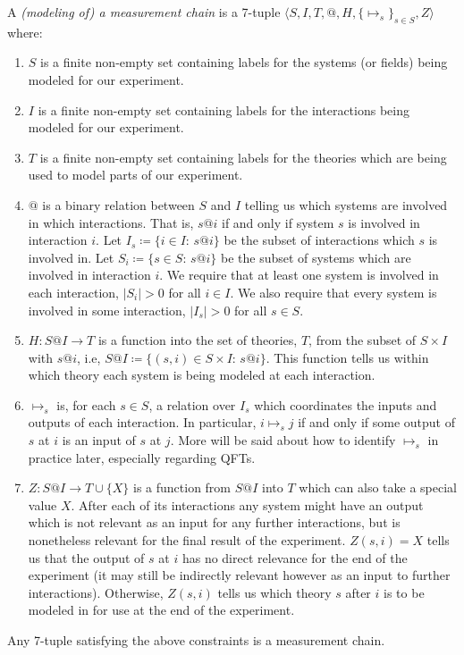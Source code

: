 \documentclass[12pt,prd,superscriptaddress,floatfix,amsmath,amssymb,amsfonts,nofootinbib]{revtex4-2}
\begin{document}
A \textit{(modeling of) a measurement chain} is a 7-tuple \mbox{$\langle S,I,T,@,H,\{\mapsto_s\}_{s\in S},Z\rangle$} where:
\begin{enumerate}
    \item $S$ is a finite non-empty set containing labels for the systems (or fields) being modeled for our experiment.
    \item $I$ is a finite non-empty set containing labels for the interactions being modeled for our experiment.
    \item $T$ is a finite non-empty set containing labels for the theories which are being used to model parts of our experiment.
    \item $@$ is a binary relation between $S$ and $I$ telling us which systems are involved in which interactions. That is, $s@i$ if and only if system $s$ is involved in interaction $i$. Let \mbox{$I_s\coloneqq\{i\in I:\, s@i\}$} be the subset of interactions which $s$ is involved in. Let \mbox{$S_i\coloneqq\{s\in S:\, s@i\}$} be the subset of systems which are involved in interaction $i$. We require that at least one system is involved in each interaction, \mbox{$\vert S_i\vert>0$} for all $i\in I$. We also require that every system is involved in some interaction, \mbox{$\vert I_s\vert>0$} for all $s\in S$.  
    \item $H:S@I\to T$ is a function into the set of theories, $T$, from the subset of $S\times I$ with $s@i$, i.e, \mbox{$S@I\coloneqq\{(s,i)\in S\times I:\, s@i\}$}. This function tells us within which theory each system is being modeled at each interaction.
    \item $\mapsto_s$ is, for each $s\in S$, a relation over $I_s$ which coordinates the inputs and outputs of each interaction. In particular, $i \mapsto_s j$ if and only if some output of $s$ at $i$ is an input of $s$ at $j$. More will be said about how to identify $\mapsto_s$ in practice later, especially regarding QFTs. 
    \item $Z:S@I\to T\cup\{X\}$ is a function from $S@I$ into $T$ which can also take a special value $X$. After each of its interactions any system might have an output which is not relevant as an input for any further interactions, but is nonetheless relevant for the final result of the experiment. $Z(s,i)=X$ tells us that the output of $s$ at $i$ has no direct relevance for the end of the experiment (it may still be indirectly relevant however as an input to further interactions). Otherwise, $Z(s,i)$ tells us which theory $s$ after $i$ is to be modeled in for use at the end of the experiment.
\end{enumerate}
Any 7-tuple satisfying the above constraints is a measurement chain.
\end{document}
